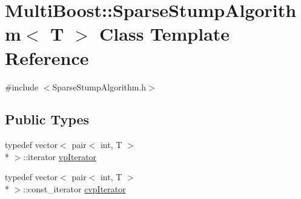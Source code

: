 \hypertarget{classMultiBoost_1_1SparseStumpAlgorithm}{\section{Multi\-Boost\-:\-:Sparse\-Stump\-Algorithm$<$ T $>$ Class Template Reference}
\label{classMultiBoost_1_1SparseStumpAlgorithm}
}


{\ttfamily \#include $<$Sparse\-Stump\-Algorithm.\-h$>$}

\subsection*{Public Types}
\begin{DoxyCompactItemize}
\item 
typedef vector$<$ pair$<$ int, T $>$\\*
 $>$\-::iterator \hyperlink{classMultiBoost_1_1SparseStumpAlgorithm_ac4d346756184d29c08539b2dde0c1d31}{vp\-Iterator}
\item 
typedef vector$<$ pair$<$ int, T $>$\\*
 $>$\-::const\-\_\-iterator \hyperlink{classMultiBoost_1_1SparseStumpAlgorithm_a268cf150b7c667fc60f79dbc55790532}{cvp\-Iterator}
\end{DoxyCompactItemize}
